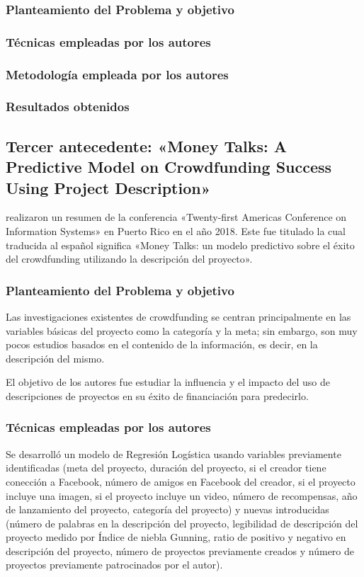 \subsubsection{Planteamiento del Problema y objetivo}


\subsubsection{Técnicas empleadas por los autores}
 

\subsubsection{Metodología empleada por los autores}


\subsubsection{Resultados obtenidos}



\subsection{Tercer antecedente: «Money Talks: A Predictive Model on Crowdfunding Success Using Project Description» \citep*{pr_zhou2018projectdesc}}
\citeauthor{pr_zhou2018projectdesc} realizaron un resumen de la conferencia «Twenty-first Americas Conference on Information Systems» en Puerto Rico en el año 2018. Este fue titulado  la cual traducida al español significa «Money Talks: un modelo predictivo sobre el éxito del crowdfunding utilizando la descripción del proyecto».

\subsubsection{Planteamiento del Problema y objetivo}
Las investigaciones existentes de crowdfunding se centran principalmente en las variables básicas del proyecto como la categoría y la meta; sin embargo, son muy pocos estudios basados en el contenido de la información, es decir, en la descripción del mismo.

El objetivo de los autores fue estudiar la influencia y el impacto del uso de descripciones de proyectos en su éxito de financiación para predecirlo.

\subsubsection{Técnicas empleadas por los autores}
Se desarrolló un modelo de Regresión Logística usando variables previamente identificadas (meta del proyecto, duración del proyecto, si el creador tiene conección a Facebook, número de amigos en Facebook del creador, si el proyecto incluye una imagen, si el proyecto incluye un video, número de recompensas, año de lanzamiento del proyecto, categoría del proyecto) y nuevas introducidas (número de palabras en la descripción del proyecto, legibilidad de descripción del proyecto medido por Índice de niebla Gunning, ratio de positivo y negativo en descripción del proyecto, número de proyectos previamente creados y número de proyectos previamente patrocinados por el autor).

